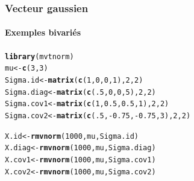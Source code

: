 \documentclass{beamer}\usepackage[]{graphicx}\usepackage[]{color}
\makeatletter
\newcommand{\hlnum}[1]{\textcolor[rgb]{0.686,0.059,0.569}{#1}}%
\newcommand{\hlopt}[1]{\textcolor[rgb]{0,0,0}{#1}}%
\newcommand{\hlstd}[1]{\textcolor[rgb]{0.345,0.345,0.345}{#1}}%
\newcommand{\hlkwb}[1]{\textcolor[rgb]{0.69,0.353,0.396}{#1}}%
\newcommand{\hlkwd}[1]{\textcolor[rgb]{0.737,0.353,0.396}{\textbf{#1}}}%
\newenvironment{kframe}{%
 \def\at@end@of@kframe{}%
 \ifinner\ifhmode%
  \def\at@end@of@kframe{\end{minipage}}%
  \begin{minipage}{\columnwidth}%
 \fi\fi%
 \def\FrameCommand##1{\hskip\@totalleftmargin \hskip-\fboxsep
 \colorbox{shadecolor}{##1}\hskip-\fboxsep
     \hskip-\linewidth \hskip-\@totalleftmargin \hskip\columnwidth}%
 \MakeFramed {\advance\hsize-\width
   \@totalleftmargin\z@ \linewidth\hsize
   \@setminipage}}%
 {\par\unskip\endMakeFramed%
 \at@end@of@kframe}
\newenvironment{knitrout}{}{} %
\makeatother
\begin{document}
\begin{frame}[fragile]
  \frametitle{Vecteur gaussien}
  \framesubtitle{Exemples bivariés}

\begin{knitrout}\scriptsize
{}\color{fgcolor}\begin{kframe}
\begin{alltt}
\hlkwd{library}\hlstd{(mvtnorm)}
\hlstd{mu} \hlkwb{<-} \hlkwd{c}\hlstd{(}\hlnum{3}\hlstd{,}\hlnum{3}\hlstd{)}
\hlstd{Sigma.id}   \hlkwb{<-} \hlkwd{matrix}\hlstd{(}\hlkwd{c}\hlstd{(}\hlnum{1}\hlstd{,}\hlnum{0}\hlstd{,}\hlnum{0}\hlstd{,}\hlnum{1}\hlstd{),} \hlnum{2}\hlstd{,} \hlnum{2}\hlstd{)}
\hlstd{Sigma.diag} \hlkwb{<-} \hlkwd{matrix}\hlstd{(}\hlkwd{c}\hlstd{(}\hlnum{.5}\hlstd{,}\hlnum{0}\hlstd{,}\hlnum{0}\hlstd{,}\hlnum{5}\hlstd{),} \hlnum{2}\hlstd{,} \hlnum{2}\hlstd{)}
\hlstd{Sigma.cov1} \hlkwb{<-} \hlkwd{matrix}\hlstd{(}\hlkwd{c}\hlstd{(}\hlnum{1}\hlstd{,}\hlnum{0.5}\hlstd{,}\hlnum{0.5}\hlstd{,}\hlnum{1}\hlstd{),} \hlnum{2}\hlstd{,} \hlnum{2}\hlstd{)}
\hlstd{Sigma.cov2} \hlkwb{<-} \hlkwd{matrix}\hlstd{(}\hlkwd{c}\hlstd{(}\hlnum{.5}\hlstd{,}\hlopt{-}\hlnum{0.75}\hlstd{,}\hlopt{-}\hlnum{0.75}\hlstd{,}\hlnum{3}\hlstd{),} \hlnum{2}\hlstd{,} \hlnum{2}\hlstd{)}

\hlstd{X.id}    \hlkwb{<-} \hlkwd{rmvnorm}\hlstd{(}\hlnum{1000}\hlstd{,mu,Sigma.id)}
\hlstd{X.diag}  \hlkwb{<-} \hlkwd{rmvnorm}\hlstd{(}\hlnum{1000}\hlstd{,mu,Sigma.diag)}
\hlstd{X.cov1} \hlkwb{<-} \hlkwd{rmvnorm}\hlstd{(}\hlnum{1000}\hlstd{,mu,Sigma.cov1)}
\hlstd{X.cov2} \hlkwb{<-} \hlkwd{rmvnorm}\hlstd{(}\hlnum{1000}\hlstd{,mu,Sigma.cov2)}
\end{alltt}
\end{kframe}
\end{knitrout}

\end{frame}
\end{document}
